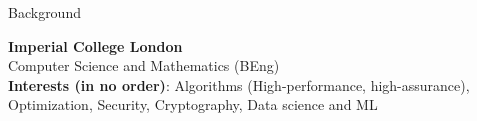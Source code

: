 \documentclass[10pt]{resume} %
\begin{document}

\begin{rSection}{Background}

{\bf Imperial College London} \hfill \\
Computer Science and Mathematics (BEng)\\


\textbf{Interests (in no order)}:
  Algorithms (High-performance, high-assurance),
  Optimization,
  Security,
  Cryptography,
  Data science and ML


\end{rSection}

\end{document}

